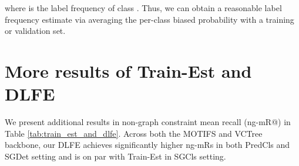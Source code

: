 \documentclass[sigconf]{acmart}
\begin{document}
where  is the label frequency of class .
Thus, we can obtain a reasonable label frequency estimate via averaging the per-class biased probability with a training or validation set.

\section{More results of Train-Est and DLFE}
\label{sec:appendix_more_results_train_est_dlfe}
We present additional results in non-graph constraint mean recall (ng-mR@) in Table \ref{tab:train_est_and_dlfe}.
Across both the MOTIFS \cite{zellers2018neural} and VCTree \cite{tang2019learning} backbone, our DLFE achieves significantly higher ng-mRs in both PredCls and SGDet setting and is on par with Train-Est in SGCls setting.

\begin{table*}[t!]
\centering
\def\arraystretch{1.1}
\vspace{0.1em}
\caption{Comparison of non-graph constraint mean recalls (ng-mR@) between Train-Est and our DLFE, in PredCls, SGCls and SGDet. 
}
\label{tab:train_est_and_dlfe}
\vspace{-1em}
\end{table*}
\end{document}
